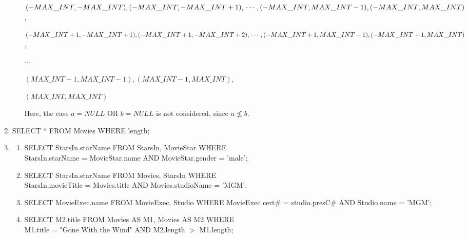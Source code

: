 \documentclass[12pt]{article}
\begin{document}
\begin{enumerate}[1.]
\begin{enumerate}[a)]
        \bigskip

        $(-MAX\_INT, -MAX\_INT), (-MAX\_INT,-MAX\_INT + 1), \\
        \cdots, (-MAX\_INT,MAX\_INT - 1),\\
        (-MAX\_INT,MAX\_INT)$,

        \bigskip

        $(-MAX\_INT + 1, -MAX\_INT + 1), (-MAX\_INT + 1,-MAX\_INT + 2), \\
        \cdots, (-MAX\_INT + 1,MAX\_INT - 1),\\
        (-MAX\_INT + 1,MAX\_INT)$,

        \bigskip

        $\cdots$

        \bigskip

        $(MAX\_INT - 1, MAX\_INT - 1), (MAX\_INT - 1,MAX\_INT)$,

        \bigskip

        $(MAX\_INT, MAX\_INT)$

        \bigskip

        Here, the case $a = NULL$ OR $b = NULL$ is not considered, since $a \nleq b$.
    \end{enumerate}

    \item

    SELECT * FROM Movies WHERE length;

    \item

    \begin{enumerate}
        \item SELECT StarsIn.starName FROM StarsIn, MovieStar WHERE \\
        StarsIn.starName = MovieStar.name AND MovieStar.gender = 'male';

        \item SELECT StarsIn.starName FROM Movies, StarsIn WHERE \\
        StarsIn.movieTitle = Movies.title AND Movies.studioName = 'MGM';

        \item SELECT MovieExec.name FROM MovieExec, Studio WHERE
        MovieExec cert\# = studio.presC\# AND Studio.name = 'MGM';

        \item SELECT M2.title FROM Movies AS M1, Movies AS M2 WHERE\\
        M1.title = "Gone With the Wind" AND M2.length $>$ M1.length;


\end{enumerate}
\end{enumerate}
\end{document}
